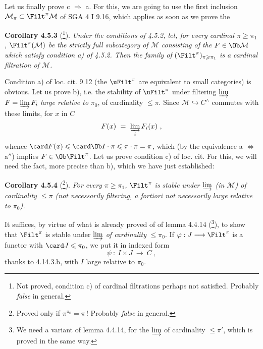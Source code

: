 Let us finally prove c $\Longrightarrow$ a. For this, we are going to use the first inclusion $\mathcal{M}_{\pi} \subset \Filt^{\pi}\mathcal{M}$ of SGA 4 I 9.16, which applies as soon as we prove the

\textbf{Corollary 4.5.3} (\footnote{Not proved, condition c) of cardinal filtrations perhaps not satisfied. Probably \textit{false} in general.}). \textit{Under the conditions of 4.5.2, let, for every cardinal $\pi \geqslant \pi_1$,} $\Filt^{\pi}(\mathcal{M})$ \textit{be the strictly full subcategory of $\mathcal{M}$ consisting of the $F \in \Ob\mathcal{M}$ which satisfy condition a) of 4.5.2. Then the family of} $(\Filt^{\pi})_{\pi\geqslant\pi_1}$ \textit{is a}
\textit{cardinal filtration of $\mathcal{M}$.}

Condition a) of loc. cit. 9.12 (the $\uFilt^{\pi}$ are equivalent to small categories) is obvious. Let us prove b), i.e. the stability of $\uFilt^{\pi}$ under filtering $\varinjlim$ $F = \varinjlim F_i$ \textit{large relative to} $\pi_0$, of cardinality $\leqslant \pi$. Since $\mathcal{M} \hookrightarrow C^{\wedge}$ commutes with these limits, for $x$ in $C$
\[
F(x) \ =\ \varinjlim_{i} F_i(x)\ ,
\]
whence $\card F(x) \leqslant \card\Ob I \cdot \pi \leqslant \pi \cdot \pi = \pi$, which (by the equivalence a $\Longleftrightarrow$ a$''$) implies $F \in \Ob\Filt^{\pi}$. Let us prove condition c) of loc. cit. For this, we will need the fact, more precise than b), which we have just established:

\textbf{Corollary 4.5.4} (\footnote{Proved only if $\pi^{\pi_0} = \pi$\,! Probably \textit{false} in general.}). \textit{For every $\pi \geqslant \pi_1$,} $\Filt^{\pi}$ \textit{is stable under $\varinjlim$ (in $\mathcal{M}$) of cardinality $\leqslant \pi$ (not necessarily filtering, a fortiori not necessarily large relative to $\pi_0$).}

It suffices, by virtue of what is already proved of of lemma 4.4.14 (\footnote{We need a variant of lemma 4.4.14, for the $\varinjlim$ of cardinality $\leqslant \pi'$, which is proved in the same way.}), to show that $\Filt^{\pi}$ %
is stable under $\varinjlim$ \textit{of cardinality} $\leqslant \pi_0$. If $\varphi : J \longrightarrow \Filt^{\pi}$ is a functor with $\card J \leqslant \pi_0$, we put it in indexed form
\[
\psi\ :\ I \times J \ \longrightarrow\ C\ ,
\]
thanks to 4.14.3.b, with $I$ large relative to $\pi_0$.

